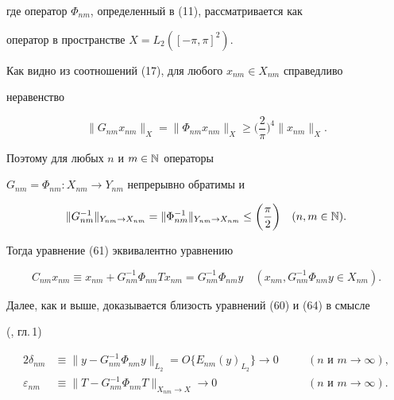 где оператор $\Phi_{n m}$, определенный в (11), рассматривается как 


оператор в пространстве $X=L_2([-\pi,\pi]^2)$. 


 


Как видно из соотношений (17), для любого $x_{nm}\in X_{nm}$ справедливо 


неравенство 


\begin{equation} 


\|G_{nm}x_{nm}\|_X=\|\Phi_{nm}x_{nm}\|_X\ge 


\bigg(\frac{2}{\pi} \bigg)^4\|x_{nm}\|_X. 


\end{equation} 


Поэтому для любых $n$ и $m\in\Bbb N$ операторы 


$G_{nm}=\Phi_{nm}:X_{nm}\to Y_{nm}$ непрерывно обратимы и 


\begin{equation} 


\|G^{-1}_{nm}\|_{Y_{nm}\to X_{nm}}=\|\Phi^{-1}_{nm} 


\|_{Y_{nm}\to X_{nm}}\le\bigg(\frac{\pi}{2} \bigg)\quad 


(n,m\in\Bbb N). 


\end{equation} 


Тогда уравнение (61) эквивалентно уравнению 


\begin{equation} 


C_{nm}x_{nm}\equiv x_{nm}+G^{-1}_{nm}\Phi_{nm}T x_{nm}= 


G^{-1}_{nm}\Phi_{nm}y\quad 


(x_{nm},G^{-1}_{nm}\Phi_{nm}y\in X_{nm}). 


\end{equation} 


Далее, как и выше, доказывается близость уравнений (60) и (64) в смысле 


(\cite{9}, гл.\,1) 


\begin{alignat}{2} 


\delta_{nm}&\equiv\|y-G^{-1}_{nm}\Phi_{nm}y\|_{L_2}= 


O\{E_{nm}(y)_{L_2}\}\to 0&\quad &(\text{$n$ и $m\to\infty$}), \\ 


% 


\varepsilon_{nm}&\equiv\|T-G^{-1}_{nm}\Phi_{nm}T 


\|_{X_{nm}\to X}\to 0 &\quad &(\text{$n$ и $m\to\infty$}). 


\end{alignat} 


